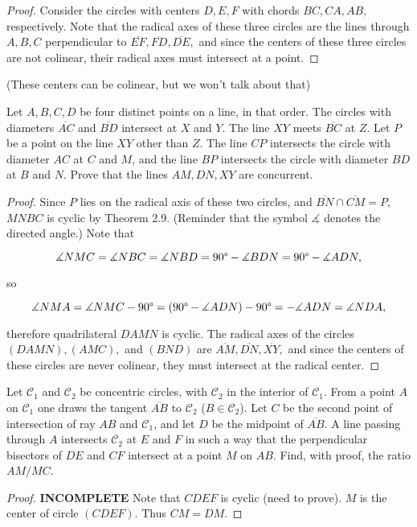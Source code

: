 \documentclass[letterpaper,oneside]{scrartcl}
\begin{document}
\begin{proof}  Consider the circles with centers $D,E,F$ with chords $BC, CA, AB,$ respectively. Note that the radical axes of these three circles are the lines through $A,B,C$ perpendicular to $\overline{EF}, \overline{FD}, \overline{DE},$ and since the centers of these three circles are not colinear, their radical axes must intersect at a point. \end{proof} (These centers  can  be colinear, but we won't talk about that)

\begin{problem*}
    [2.31, IMO 1995/1]
    Let  $A, B, C, D$ be four distinct points on a line, in that order. The circles with diameters $\overline{AC}$ and $\overline{BD}$ intersect at $X$ and $Y.$ The line $XY$ meets $\overline{BC}$ at $Z.$ Let $P$ be a point on the line $XY$ other than $Z$. The line $CP$ intersects the circle with diameter $AC$ at $C$ and $M$, and the line $BP$ intersects the circle with diameter $BD$ at $B$ and $N$. Prove that the lines $AM, DN, XY$ are concurrent.
  \end{problem*}

\begin{proof}  Since $P$ lies on the radical axis of these two circles, and $\overline{BN} \cap \overline{CM} =P,$ $MNBC$ is cyclic by Theorem 2.9. (Reminder that the symbol $\measuredangle$ denotes the directed angle.) Note that

$$\measuredangle NMC = \measuredangle NBC = \measuredangle NBD = 90\degree - \measuredangle BDN =  90\degree - \measuredangle ADN,$$

so 

$$\measuredangle NMA =   \measuredangle NMC -90\degree = (90\degree - \measuredangle ADN) - 90\degree = -\measuredangle ADN = \measuredangle NDA,$$

therefore quadrilateral $DAMN$ is cyclic. The radical axes of the circles $(DAMN), (AMC),$ and $(BND)$ are $\overline{AM}, \overline{DN}, \overline{XY},$ and since the centers of these circles are never colinear, they must intersect at the radical center.
\end{proof}

\begin{problem*}
    [2.32, USAMO 1998/2]
    Let $\mathcal{C}_1$ and $\mathcal{C}_2$ be concentric circles, with $\mathcal{C}_2$ in the interior of $\mathcal{C}_1$. From a point $A$ on $\mathcal{C}_1$ one draws the tangent $\overline{AB}$ to $\mathcal{C}_2$  ($B \in  \mathcal{C}_2$). Let $C$ be the second point of intersection of ray $AB$ and $\mathcal{C}_1$, and let $D$ be the midpoint of $\overline{AB}$. A line passing through $A$ intersects $\mathcal{C}_2$ at $E$ and $F$ in such a way that the perpendicular bisectors of $DE$ and $CF$ intersect at a point $M$ on $AB$. Find, with proof, the ratio $AM/MC$.
\end{problem*}
\begin{proof}  \textbf{INCOMPLETE}
    Note that $CDEF$ is cyclic (need to prove). $M$ is the center of circle $(CDEF).$ Thus $CM=DM.$
  \end{proof}
\newpage
\end{document}
